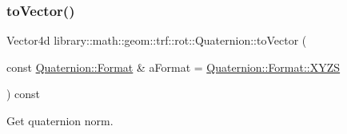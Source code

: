 \subsubsection{\texorpdfstring{to\+Vector()}{toVector()}}
{\footnotesize\ttfamily Vector4d library\+::math\+::geom\+::trf\+::rot\+::\+Quaternion\+::to\+Vector (\begin{DoxyParamCaption}\item[{const \hyperlink{classlibrary_1_1math_1_1geom_1_1trf_1_1rot_1_1_quaternion_a2ca851b117657819310fe5a9b9e5d681}{Quaternion\+::\+Format} \&}]{a\+Format = {\ttfamily \hyperlink{classlibrary_1_1math_1_1geom_1_1trf_1_1rot_1_1_quaternion_a2ca851b117657819310fe5a9b9e5d681a11c51ecd5dc6f86ba3c1ae79e21482f5}{Quaternion\+::\+Format\+::\+X\+Y\+ZS}} }\end{DoxyParamCaption}) const}



Get quaternion norm. 


